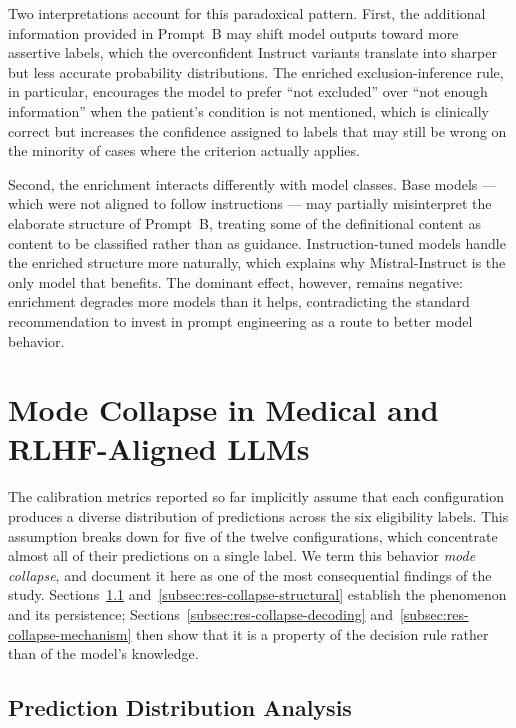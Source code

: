 Two interpretations account for this paradoxical pattern. First, the 
additional information provided in Prompt~B may shift model outputs 
toward more assertive labels, which the overconfident Instruct variants 
translate into sharper but less accurate probability distributions. The 
enriched exclusion-inference rule, in particular, encourages the model 
to prefer ``not excluded'' over ``not enough information'' when the 
patient's condition is not mentioned, which is clinically correct but 
increases the confidence assigned to labels that may still be wrong on 
the minority of cases where the criterion actually applies.

Second, the enrichment interacts differently with model classes. Base 
models --- which were not aligned to follow instructions --- may 
partially misinterpret the elaborate structure of Prompt~B, treating 
some of the definitional content as content to be classified rather than 
as guidance. Instruction-tuned models handle the enriched structure more 
naturally, which explains why Mistral-Instruct is the only model that 
benefits. The dominant effect, however, remains negative: enrichment 
degrades more models than it helps, contradicting the standard 
recommendation to invest in prompt engineering as a route to better 
model behavior.
\section{Mode Collapse in Medical and RLHF-Aligned LLMs}
\label{sec:res-mode-collapse}

The calibration metrics reported so far implicitly assume that each 
configuration produces a diverse distribution of predictions across the 
six eligibility labels. This assumption breaks down for five of the 
twelve configurations, which concentrate almost all of their predictions 
on a single label. We term this behavior \emph{mode collapse}, and 
document it here as one of the most consequential findings of the study. 
Sections~\ref{subsec:res-collapse-distribution} 
and~\ref{subsec:res-collapse-structural} establish the phenomenon and its 
persistence; Sections~\ref{subsec:res-collapse-decoding} 
and~\ref{subsec:res-collapse-mechanism} then show that it is a property 
of the decision rule rather than of the model's knowledge.

\subsection{Prediction Distribution Analysis}
\label{subsec:res-collapse-distribution}

